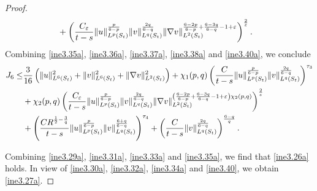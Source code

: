 \documentclass[11pt,reqno]{amsart}
\numberwithin{Thm}{section}
\begin{document}
\begin{proof}
\begin{align}
	&+ \left( \frac{C_\varepsilon}{t-s}\|u\|_{L^p(S_t)}^{\frac{p}{6-p}} \|v\|_{L^q(S_t)}^{\frac{2q}{6-q}} \|\nabla v\|_{L^2(S_t)}^{\frac{6-2p}{6-p}+\frac{6-3q}{6-q}-1+\varepsilon} \right)^{\frac{2}{\varepsilon}}.\notag
\end{align}
Combining \eqref{ine3.35a}, \eqref{ine3.36a}, \eqref{ine3.37a}, \eqref{ine3.38a} and \eqref{ine3.40a}, we conclude
\begin{align}
				J_{6} \leq& \frac{3}{16}\left(\|u\|_{L^6(S_t)}^2 + \|v\|_{L^6(S_t)}^2 + \|\nabla v\|_{L^2(S_t)}^2\right)
				+\chi_1(p,q)\left(\frac{C}{t-s}\|u\|_{L^p(S_t)}^{\frac{p}{6-p}} \|v\|_{L^q(S_t)}^{\frac{2q}{6-q}}\right)^{\tau_3}\notag\\
&+\chi_2(p,q)\left( \frac{C_\varepsilon}{t-s}\|u\|_{L^p(S_t)}^{\frac{p}{6-p}} \|v\|_{L^q(S_t)}^{\frac{2q}{6-q}} \|\nabla v\|_{L^2(S_t)}^{\left(\frac{6-2p}{6-p}+\frac{6-3q}{6-q}-1+\varepsilon\right)\chi_2(p,q)} \right)^{\frac{2}{\varepsilon}}\label{ine3.40}\\
				&+\left( \frac{C R^{\frac{1}{2}-\frac{3}{q}}}{t-s} \|u\|_{L^p(S_t)}^{\frac{p}{6-p}} \|v\|_{L^q(S_t)}^{\frac{6+q}{6-q}} \right)^{\tau_4}+ \left( \frac{C}{t-s}  \|v\|_{L^q(S_t)}^{\frac{2q}{6-q}} \right)^{\frac{6-q}{q}}.\notag
\end{align}

Combining \eqref{ine3.29a}, \eqref{ine3.31a}, \eqref{ine3.33a} and \eqref{ine3.35a}, we find that \eqref{ine3.26a} holds.
In view of \eqref{ine3.30a}, \eqref{ine3.32a}, \eqref{ine3.34a} and \eqref{ine3.40}, we obtain \eqref{ine3.27a}.
\end{proof}

	
\end{document}
